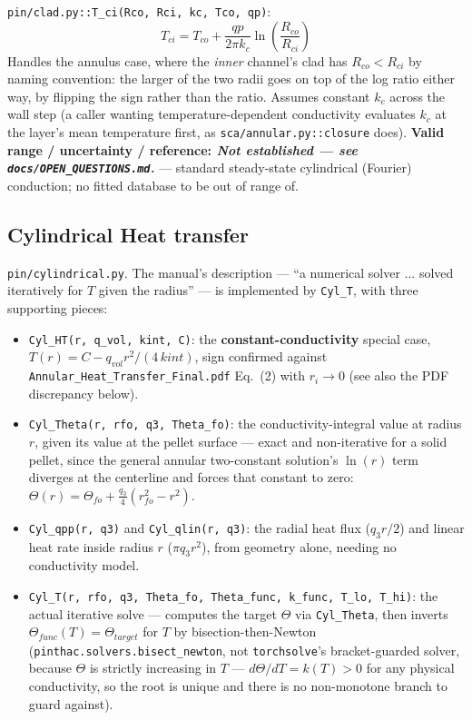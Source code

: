 \documentclass[11pt]{article}
\newcommand{\code}[1]{\texttt{#1}}
\newcommand{\notest}{\textit{Not established --- see \code{docs/OPEN\_QUESTIONS.md}.}}
\begin{document}
\code{pin/clad.py::T\_ci(Rco, Rci, kc, Tco, qp)}:
\[
  T_{ci} = T_{co} + \frac{qp}{2\pi k_c}\ln\!\left(\frac{R_{co}}{R_{ci}}\right)
\]
Handles the annulus case, where the \emph{inner} channel's clad has $R_{co}<R_{ci}$ by
naming convention: the larger of the two radii goes on top of the log ratio either way,
by flipping the sign rather than the ratio. Assumes constant $k_c$ across the wall step
(a caller wanting temperature-dependent conductivity evaluates $k_c$ at the layer's mean
temperature first, as \code{sca/annular.py::closure} does). \textbf{Valid range /
uncertainty / reference: \notest{}} --- standard steady-state cylindrical (Fourier)
conduction; no fitted database to be out of range of.

\subsection{Cylindrical Heat transfer}

\code{pin/cylindrical.py}. The manual's description --- ``a numerical solver ... solved
iteratively for $T$ given the radius'' --- is implemented by \code{Cyl\_T}, with three
supporting pieces:

\begin{itemize}
  \item \code{Cyl\_HT(r, q\_vol, kint, C)}: the \textbf{constant-conductivity} special
    case, $T(r) = C - q_{vol}r^2/(4\,kint)$, sign confirmed against
    \code{Annular\_Heat\_Transfer\_Final.pdf} Eq.\ (2) with $r_i\to0$ (see also the PDF
    discrepancy below).
  \item \code{Cyl\_Theta(r, rfo, q3, Theta\_fo)}: the conductivity-integral value at
    radius $r$, given its value at the pellet surface --- exact and non-iterative for a
    solid pellet, since the general annular two-constant solution's $\ln(r)$ term
    diverges at the centerline and forces that constant to zero: $\Theta(r) = \Theta_{fo}
    + \tfrac{q_3}{4}(r_{fo}^2-r^2)$.
  \item \code{Cyl\_qpp(r, q3)} and \code{Cyl\_qlin(r, q3)}: the radial heat flux
    ($q_3 r/2$) and linear heat rate inside radius $r$ ($\pi q_3 r^2$), from geometry
    alone, needing no conductivity model.
  \item \code{Cyl\_T(r, rfo, q3, Theta\_fo, Theta\_func, k\_func, T\_lo, T\_hi)}: the
    actual iterative solve --- computes the target $\Theta$ via \code{Cyl\_Theta}, then
    inverts $\Theta_{func}(T)=\Theta_{target}$ for $T$ by bisection-then-Newton
    (\code{pinthac.solvers.bisect\_newton}, not \code{torchsolve}'s bracket-guarded
    solver, because $\Theta$ is strictly increasing in $T$ --- $d\Theta/dT=k(T)>0$ for
    any physical conductivity, so the root is unique and there is no non-monotone
    branch to guard against).
\end{itemize}
\end{document}
